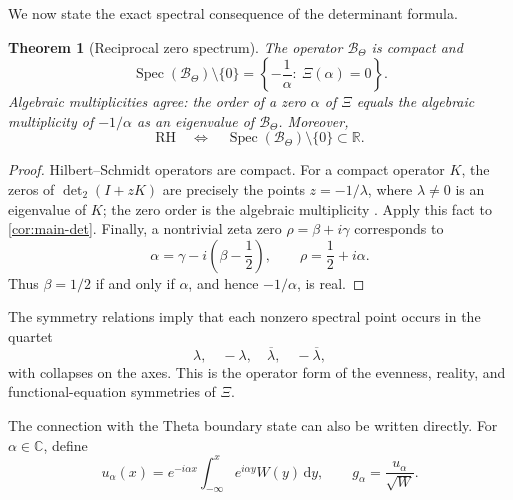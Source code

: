 \documentclass[11pt,reqno]{amsart}
\numberwithin{equation}{section}
\newtheorem{theorem}{Theorem}[section]
\newcommand{\C}{\mathbb C}
\newcommand{\R}{\mathbb R}
\newcommand{\1}{\mathbf 1}
\newcommand{\BTheta}{\mathcal B_{\Theta}}
\newcommand{\Spec}{\operatorname{Spec}}
\newcommand{\dd}{\,\mathrm d}
\newcommand{\detTwo}{\det\nolimits_{2}}
\begin{document}
We now state the exact spectral consequence of the determinant formula.

\begin{theorem}[Reciprocal zero spectrum]\label{thm:zero-spectrum}
The operator $\BTheta$ is compact and
\begin{equation}\label{eq:zero-spectrum}
 \boxed{
 \Spec(\BTheta)\setminus\{0\}
 =\left\{-\frac1\alpha:\ \Xi(\alpha)=0\right\}.}
\end{equation}
Algebraic multiplicities agree: the order of a zero $\alpha$ of $\Xi$ equals
the algebraic multiplicity of $-1/\alpha$ as an eigenvalue of $\BTheta$.
Moreover,
\begin{equation}\label{eq:RH-equivalence}
 \boxed{
 \mathrm{RH}
 \quad\Longleftrightarrow\quad
 \Spec(\BTheta)\setminus\{0\}\subset\R.}
\end{equation}
\end{theorem}

\begin{proof}
Hilbert--Schmidt operators are compact.  For a compact operator $K$, the zeros
of $\detTwo(I+zK)$ are precisely the points $z=-1/\lambda$, where
$\lambda\neq0$ is an eigenvalue of $K$; the zero order is the algebraic
multiplicity \cite[Chapter 9]{Simon2005}.  Apply this fact to
\cref{cor:main-det}.  Finally, a nontrivial zeta zero
$\rho=\beta+i\gamma$ corresponds to
\begin{equation}\label{eq:alpha-rho}
 \alpha=\gamma-i\left(\beta-\frac12\right),
 \qquad
 \rho=\frac12+i\alpha.
\end{equation}
Thus $\beta=1/2$ if and only if $\alpha$, and hence $-1/\alpha$, is real.
\end{proof}

The symmetry relations imply that each nonzero spectral point occurs in the
quartet
\begin{equation}\label{eq:spectral-quartet}
 \lambda,\quad-\lambda,\quad\overline\lambda,
 \quad-\overline\lambda,
\end{equation}
with collapses on the axes.  This is the operator form of the evenness,
reality, and functional-equation symmetries of $\Xi$.

The connection with the Theta boundary state can also be written directly.
For $\alpha\in\C$, define
\begin{equation}\label{eq:u-alpha}
 u_\alpha(x)=e^{-i\alpha x}
 \int_{-\infty}^xe^{i\alpha y}W(y)\dd y,
 \qquad
 g_\alpha=\frac{u_\alpha}{\sqrt W}.
\end{equation}
\end{document}
